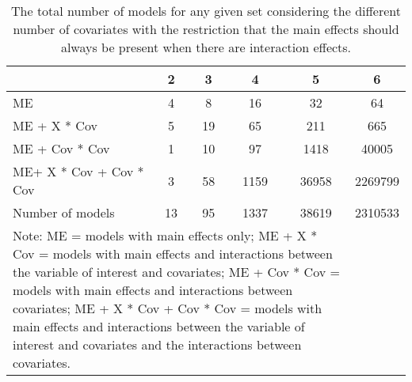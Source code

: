 \begin{table}[!h]
\centering
\caption{The total number of models for any given set considering the different number of covariates with the restriction that the main effects should always be present when there are interaction effects.} 
\begin{tabular}{lccccc}
  \hline
 & 2 & 3 & 4 & 5 & 6 \\ 
  \hline
ME & 4 & 8 & 16 & 32 & 64 \\ 
  ME + X * Cov & 5 & 19 & 65 & 211 & 665 \\ 
  ME + Cov * Cov & 1 & 10 & 97 & 1418 & 40005 \\ 
  ME+ X * Cov + Cov * Cov & 3 & 58 & 1159 & 36958 & 2269799 \\ 
  Number of models & 13 & 95 & 1337 & 38619 & 2310533 \\ 
   \hline 
\multicolumn{5}{p{6cm}}{\footnotesize{Note: ME = models with main effects only; ME + X * Cov = models with main effects and interactions between the variable of interest and covariates; ME + Cov * Cov = models with main effects and interactions between covariates; ME + X * Cov + Cov * Cov = models with main effects and interactions between the variable of interest and covariates and the interactions between covariates.}} 
 \hline
\end{tabular}
\end{table}
